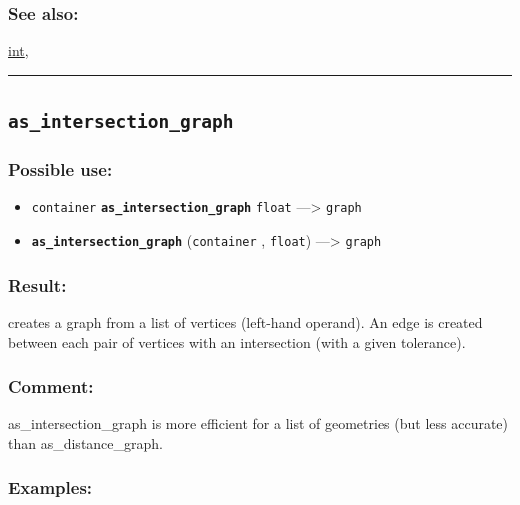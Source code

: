 \documentclass[]{book}
\providecommand{\tightlist}{%
  \setlength{\itemsep}{0pt}\setlength{\parskip}{0pt}}
\theoremstyle{definition}
\theoremstyle{definition}
\theoremstyle{definition}
\theoremstyle{remark}
\begin{document}
\subsubsection{See also:}\label{see-also-35}

\href{operators-i-to-m.html\#int}{int},

\begin{center}\rule{0.5\linewidth}{\linethickness}\end{center}

\subsection{\texorpdfstring{\texttt{as\_intersection\_graph}}{as\_intersection\_graph}}\label{as_intersection_graph}

\subsubsection{Possible use:}\label{possible-use-51}

\begin{itemize}
\tightlist
\item
  \texttt{container} \textbf{\texttt{as\_intersection\_graph}}
  \texttt{float} ---\textgreater{} \texttt{graph}
\item
  \textbf{\texttt{as\_intersection\_graph}} (\texttt{container} ,
  \texttt{float}) ---\textgreater{} \texttt{graph}
\end{itemize}

\subsubsection{Result:}\label{result-50}

creates a graph from a list of vertices (left-hand operand). An edge is
created between each pair of vertices with an intersection (with a given
tolerance).

\subsubsection{Comment:}\label{comment-10}

as\_intersection\_graph is more efficient for a list of geometries (but
less accurate) than as\_distance\_graph.

\subsubsection{Examples:}\label{examples-42}
\end{document}
